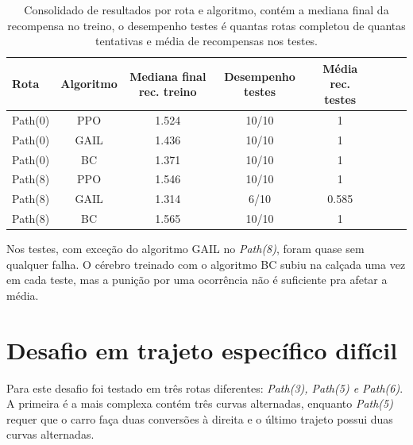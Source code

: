 \begin{table}[htpb]
    \centering
    \caption{Consolidado de resultados por rota e algoritmo, contém a mediana final da recompensa no treino, o desempenho testes é quantas rotas completou de quantas tentativas e média de recompensas nos testes.}
    \label{resultado-tabela-desafio-1}
    \begin{tabular}{|l|c|c|c|c|c|c|r|}
         \hline
         \small{Rota} & \small{Algoritmo}   & \small{Mediana final rec. treino}  & \small{Desempenho testes}    & \small{Média rec. testes} \\ \hline
            Path(0)   &      PPO            &   1.524                            &    10/10                     &      1                    \\ \hline
            Path(0)   &      GAIL           &   1.436                            &    10/10                     &      1                    \\ \hline
            Path(0)   &      BC             &   1.371                            &    10/10                     &      1                    \\ \hline
            Path(8)   &      PPO            &   1.546                            &    10/10                     &      1                    \\ \hline
            Path(8)   &      GAIL           &   1.314                            &    6/10                      &      0.585                \\ \hline
            Path(8)   &      BC             &   1.565                            &    10/10                     &      1                    \\ \hline
    \end{tabular}
\end{table}


Nos testes, com exceção do algoritmo GAIL no \textit{Path(8)}, foram quase sem qualquer falha. O  cérebro treinado com o algoritmo BC subiu na calçada uma vez em cada teste, mas a punição por uma ocorrência não é suficiente pra afetar a média.

\section{Desafio em trajeto específico difícil}
Para este desafio foi testado em três rotas diferentes: \textit{Path(3), Path(5) e Path(6)}. A primeira é a mais complexa contém três curvas alternadas, enquanto \textit{Path(5)} requer que o carro faça duas conversões à direita e o último trajeto possui duas curvas alternadas. 

